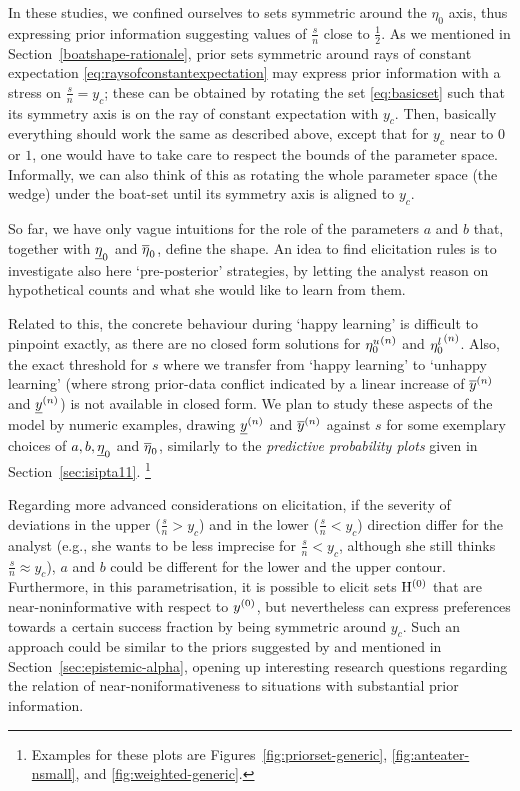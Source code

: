 In these studies, we confined ourselves to sets symmetric around the $\eta_0$ axis,
thus expressing prior information suggesting values of $\frac{s}{n}$ close to $\frac{1}{2}$.
As we mentioned in Section~\ref{boatshape-rationale},
prior sets symmetric around rays of constant expectation \eqref{eq:raysofconstantexpectation}
may express prior information with a stress on $\frac{s}{n}=y_c$;
these can be obtained by rotating the set \eqref{eq:basicset} such that
its symmetry axis is on the ray of constant expectation with $y_c$.
Then, basically everything should work the same as described above,
except that for $y_c$ near to $0$ or $1$, one would have to take care to respect
the bounds of the parameter space.
Informally, we can also think of this as rotating the whole parameter space (the wedge)
under the boat-set until its symmetry axis is aligned to $y_c$. 

So far, we have only vague intuitions for the role of the parameters $a$ and $b$ that,
together with $\underline{\eta}_0$ and $\overline{\eta}_0$, define the shape.
An idea to find elicitation rules is to investigate also here `pre-posterior' strategies,
by letting the analyst reason on hypothetical counts and what she would like to learn from them.

Related to this, the concrete behaviour during `happy learning' is difficult to pinpoint exactly,
as there are no closed form solutions for ${\eta_0^u}^{(n)}$ and ${\eta_0^l}^{(n)}$.
Also, the exact threshold for $s$ where we transfer from `happy learning' to `unhappy learning'
(where strong prior-data conflict indicated by a linear increase of $\overline{y}^{(n)}$ and $\underline{y}^{(n)}$) is not available in closed form.
We plan to study these aspects of the model by numeric examples,
drawing $\underline{y}^{(n)}$ and $\overline{y}^{(n)}$ against $s$ for some exemplary choices of $a, b, \underline{\eta}_0$ and $\overline{\eta}_0$,
similarly to the \emph{predictive probability plots} given in Section~\ref{sec:isipta11}.%
\footnote{Examples for these plots are Figures~\ref{fig:priorset-generic},
\ref{fig:anteater-nsmall}, and \ref{fig:weighted-generic}.}

Regarding more advanced considerations on elicitation, if the severity of deviations
in the upper ($\frac{s}{n} > y_c$) and in the lower ($\frac{s}{n} < y_c$) direction
differ for the analyst
(e.g., she wants to be less imprecise for $\frac{s}{n} < y_c$, although she still thinks $\frac{s}{n} \approx y_c$),
$a$ and $b$ could be different for the lower and the upper contour.
Furthermore, in this parametrisation, it is possible to elicit sets $\mathrm{H}^{(0)}$
that are near-noninformative with respect to $y^{(0)}$,
but nevertheless can express preferences towards a certain success fraction by being symmetric around $y_c$.
Such an approach could be similar to the priors suggested by \textcite{1996:atwood} and \textcite{2011:kelly:atwood}
mentioned in Section~\ref{sec:epistemic-alpha},
opening up interesting research questions regarding the relation of near-noniformativeness
to situations with substantial prior information.






%

